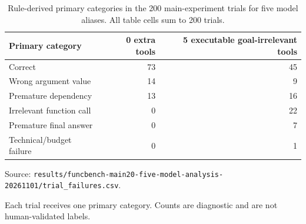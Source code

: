 \begin{table}[htbp]
\centering
\caption{Rule-derived primary categories in the 200 main-experiment trials for five model aliases. All table cells sum to 200 trials.}
\label{tab:errors}
\footnotesize
\setlength{\tabcolsep}{3pt}
\renewcommand{\arraystretch}{1.08}
\begin{tabularx}{\textwidth}{>{\raggedright\arraybackslash}Xrr}
\toprule
Primary category & 0 extra tools & 5 executable goal-irrelevant tools \\
\midrule
Correct & 73 & 45 \\
Wrong argument value & 14 & 9 \\
Premature dependency & 13 & 16 \\
Irrelevant function call & 0 & 22 \\
Premature final answer & 0 & 7 \\
Technical/budget failure & 0 & 1 \\
\bottomrule
\end{tabularx}
\par\parbox{\linewidth}{\raggedright\footnotesize Source: \texttt{results/\allowbreak{}funcbench-main20-five-model-analysis-20261101/\allowbreak{}trial\_failures.csv}.}
\par\parbox{\linewidth}{\raggedright\footnotesize Each trial receives one primary category. Counts are diagnostic and are not human-validated labels.}
\end{table}
